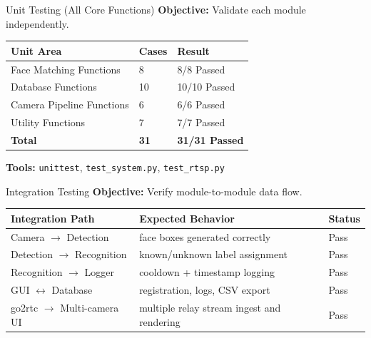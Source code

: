 \documentclass[10pt]{beamer}
\begin{document}
\begin{frame}{Unit Testing (All Core Functions)}
\textbf{Objective:} Validate each module independently.

\vspace{0.2cm}
\footnotesize
\begin{center}
\begin{tabular}{|p{3.8cm}|p{2.1cm}|p{3.0cm}|}
\hline
\textbf{Unit Area} & \textbf{Cases} & \textbf{Result} \\ \hline
Face Matching Functions & 8 & 8/8 Passed \\ \hline
Database Functions & 10 & 10/10 Passed \\ \hline
Camera Pipeline Functions & 6 & 6/6 Passed \\ \hline
Utility Functions & 7 & 7/7 Passed \\ \hline
\textbf{Total} & \textbf{31} & \textbf{31/31 Passed} \\ \hline
\end{tabular}
\end{center}
\normalsize

\textbf{Tools:} \texttt{unittest}, \texttt{test\_system.py}, \texttt{test\_rtsp.py}
\end{frame}

\begin{frame}{Integration Testing}
\textbf{Objective:} Verify module-to-module data flow.

\vspace{0.2cm}
\footnotesize
\begin{center}
\begin{tabular}{|p{3.7cm}|p{3.8cm}|p{1.5cm}|}
\hline
\textbf{Integration Path} & \textbf{Expected Behavior} & \textbf{Status} \\ \hline
Camera $\rightarrow$ Detection & face boxes generated correctly & Pass \\ \hline
Detection $\rightarrow$ Recognition & known/unknown label assignment & Pass \\ \hline
Recognition $\rightarrow$ Logger & cooldown + timestamp logging & Pass \\ \hline
GUI $\leftrightarrow$ Database & registration, logs, CSV export & Pass \\ \hline
go2rtc $\rightarrow$ Multi-camera UI & multiple relay stream ingest and rendering & Pass \\ \hline
\end{tabular}
\end{center}
\normalsize
\end{frame}
\end{document}
